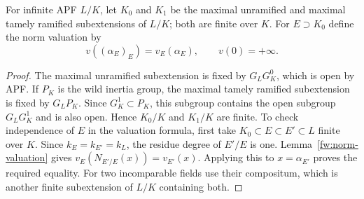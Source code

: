 \begin{definition}
\label{fw:norm-families}
\leanok
For infinite APF $L/K$, let $K_0$ and $K_1$ be the maximal unramified and
maximal tamely ramified subextensions of $L/K$; both are finite over $K$.
For $E\supset K_0$ define the norm valuation by
\[
 v((\alpha_E)_E)=v_E(\alpha_E),\qquad v(0)=+\infty.
\]
\end{definition}
\begin{proof}
The maximal unramified subextension is fixed by
$G_LG_K^0$, which is open by APF. If $P_K$ is the wild inertia group,
the maximal tamely ramified subextension is fixed by $G_LP_K$.
Since $G_K^1\subset P_K$, this subgroup contains the open subgroup
$G_LG_K^1$ and is also open. Hence $K_0/K$ and $K_1/K$ are finite.
To check independence of $E$ in the valuation formula,
first take $K_0\subset E\subset E'\subset L$ finite over $K$.
Since $k_E=k_{E'}=k_L$, the residue degree of $E'/E$ is one.
Lemma~\ref{fw:norm-valuation} gives
$v_E(N_{E'/E}(x))=v_{E'}(x)$.
Applying this to $x=\alpha_{E'}$ proves the required equality.
For two incomparable fields use their compositum, which is another finite
subextension of $L/K$ containing both.
\end{proof}

